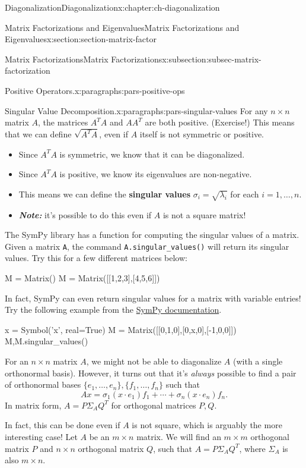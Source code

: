 \documentclass[oneside,10pt,]{book}
\newcommand{\mono}[1]{\texttt{#1}}
\newcommand{\alert}[1]{\textbf{\textit{#1}}}
\newcommand{\terminology}[1]{\textbf{#1}}
\numberwithin{equation}{section}
\begin{document}
\begin{chapterptx}{Diagonalization}{}{Diagonalization}{}{}{x:chapter:ch-diagonalization}
\begin{sectionptx}{Matrix Factorizations and Eigenvalues}{}{Matrix Factorizations and Eigenvalues}{}{}{x:section:section-matrix-factor}
\begin{subsectionptx}{Matrix Factorizations}{}{Matrix Factorizations}{}{}{x:subsection:subsec-matrix-factorization}
\begin{paragraphs}{Positive Operators.}{x:paragraphs:pars-positive-ops}
\end{paragraphs}%
\begin{paragraphs}{Singular Value Decomposition.}{x:paragraphs:pars-singular-values}%
For any \(n\times n\) matrix \(A\), the matrices \(A^TA\) and \(AA^T\) are both positive. (Exercise!) This means that we can define \(\sqrt{A^TA}\), even if \(A\) itself is not symmetric or positive.%
\par
%
\begin{itemize}[label=\textbullet]
\item{}Since \(A^TA\) is symmetric, we know that it can be diagonalized.%
\item{}Since \(A^TA\) is positive, we know its eigenvalues are non-negative.%
\item{}This means we can define the \terminology{singular values} \(\sigma_i = \sqrt{\lambda_i}\) for each \(i=1,\ldots, n\).%
\item{}\alert{Note:} it's possible to do this even if \(A\) is not a square matrix!%
\end{itemize}
%
\par
The SymPy library has a function for computing the singular values of a matrix. Given a matrix \mono{A}, the command \mono{A.singular\_values()} will return its singular values. Try this for a few different matrices below:%
\begin{sageinput}
M = Matrix()
M = Matrix([[1,2,3],[4,5,6]])
\end{sageinput}
In fact, SymPy can even return singular values for a matrix with variable entries! Try the following example from the \href{https://docs.sympy.org/latest/modules/matrices/matrices.html\#sympy.matrices.matrices.MatrixEigen.singular_values}{SymPy documentation}.%
\begin{sageinput}
x = Symbol('x', real=True)
M = Matrix([[0,1,0],[0,x,0],[-1,0,0]])
M,M.singular_values()
\end{sageinput}
For an \(n\times n\) matrix \(A\), we might not be able to diagonalize \(A\) (with a single orthonormal basis). However, it turns out that it's \emph{always} possible to find a pair of orthonormal bases \(\{e_1,\ldots, e_n\}, \{f_1,\ldots, f_n\}\) such that%
\begin{equation*}
Ax = \sigma_1(x\cdot e_1)f_1+\cdots + \sigma_n(x\cdot e_n)f_n\text{.}
\end{equation*}
In matrix form, \(A = P\Sigma_A Q^T\) for orthogonal matrices \(P,Q\).%
\par
In fact, this can be done even if \(A\) is not square, which is arguably the more interesting case! Let \(A\) be an \(m\times n\) matrix. We will find an \(m\times m\) orthogonal matrix \(P\) and \(n\times n\) orthogonal matrix \(Q\), such that \(A=P\Sigma_A Q^T\), where \(\Sigma_A\) is also \(m\times n\).%

\end{paragraphs}
\end{subsectionptx}
\end{sectionptx}
\end{chapterptx}
\end{document}
